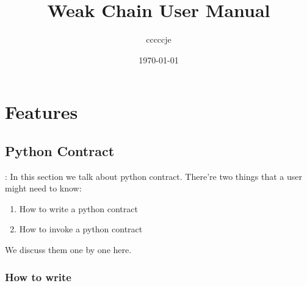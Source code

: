 \documentclass[dvipsnames]{article}
\title{Weak Chain User Manual}
\date{\today}
\author{cccccje}
\newcommand{\Wch}{\strong{\cola{Weak Chain}}}
\begin{document}
\maketitle
\tableofcontents{}
\newpage{}




% 
% 


\section{Features}
\label{sec:feat}

\subsection{Python Contract}
\label{sec:how-to-py}
 : In this section we talk about python contract. There're two
things that a user might need to know:
\begin{enumerate}
\item How to write a python contract
\item How to invoke a python contract
\end{enumerate}
We discuss them one by one here.
\subsubsection{How to write}
\end{document}
